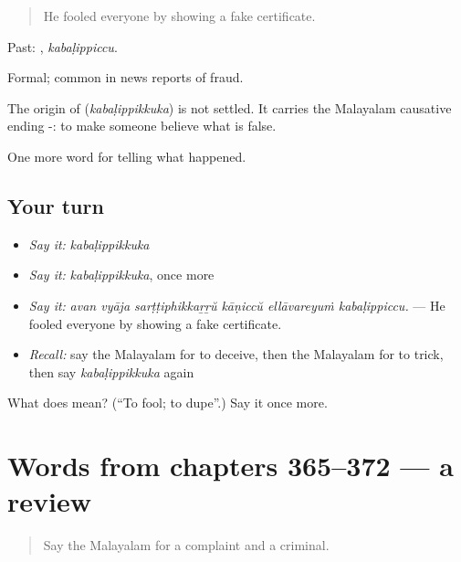 \begin{quote}
He fooled everyone by showing a fake certificate.
\end{quote}

Past: , \emph{kabaḷippiccu}.

Formal; common in news reports of fraud.

\begin{cousinweb}
The origin of \textbf{} (\emph{kabaḷippikkuka}) is not settled. It carries the Malayalam causative ending -: to make someone believe what is false.
\end{cousinweb}

\begin{grammarlens}[title={What you've built}]
One more word for telling what happened.
\end{grammarlens}

\subsection*{Your turn}
\begin{itemize}
\raggedright
  \item \emph{Say it:} \emph{kabaḷippikkuka}
  \item \emph{Say it:} \emph{kabaḷippikkuka}, once more
  \item \emph{Say it:} \emph{avan vyāja sarṭṭiphikkaṟṟŭ kāṇiccŭ ellāvareyuṁ kabaḷippiccu.} — He fooled everyone by showing a fake certificate.
  \item \emph{Recall:} say the Malayalam for to deceive, then the Malayalam for to trick, then say \emph{kabaḷippikkuka} again
\end{itemize}

\begin{tcolorbox}[breakable,colback=teal!4,colframe=teal!35!black,title={Before you move on}]
What does  mean? (\textquotedblleft{}To fool; to dupe\textquotedblright{}.) Say it once more.
\end{tcolorbox}
\section[(dialogue)]{Words from chapters 365–372 — a review}

\label{lesson:ML-R372-review-365-372}



\begin{quote}
Say the Malayalam for a complaint and a criminal.
\end{quote}

